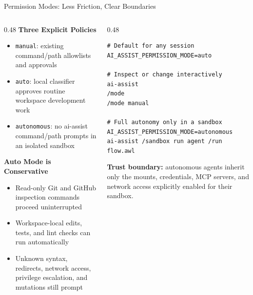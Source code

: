 \documentclass[aspectratio=169,10pt]{beamer}
\begin{document}
\begin{frame}[fragile]{Permission Modes: Less Friction, Clear Boundaries}
\begin{columns}[T]
\begin{column}{0.48\textwidth}
\textbf{\color{rhblue}Three Explicit Policies}
\begin{itemize}\scriptsize
  \item \texttt{manual}: existing command/path allowlists and approvals
  \item \texttt{auto}: local classifier approves routine workspace development work
  \item \texttt{autonomous}: no ai-assist command/path prompts in an isolated sandbox
\end{itemize}

\medskip
\textbf{\color{rhgreen}Auto Mode is Conservative}
\begin{itemize}\scriptsize
  \item Read-only Git and GitHub inspection commands proceed uninterrupted
  \item Workspace-local edits, tests, and lint checks can run automatically
  \item Unknown syntax, redirects, network access, privilege escalation, and mutations still prompt
\end{itemize}
\end{column}
\begin{column}{0.48\textwidth}
\begin{lstlisting}[style=code,basicstyle=\ttfamily\scriptsize]
# Default for any session
AI_ASSIST_PERMISSION_MODE=auto

# Inspect or change interactively
ai-assist
/mode
/mode manual

# Full autonomy only in a sandbox
AI_ASSIST_PERMISSION_MODE=autonomous
ai-assist /sandbox run agent /run flow.awl
\end{lstlisting}

\smallskip
\scriptsize\color{rhred}\textbf{Trust boundary:} autonomous agents inherit only
the mounts, credentials, MCP servers, and network access explicitly enabled
for their sandbox.
\end{column}
\end{columns}
\end{frame}
\end{document}
